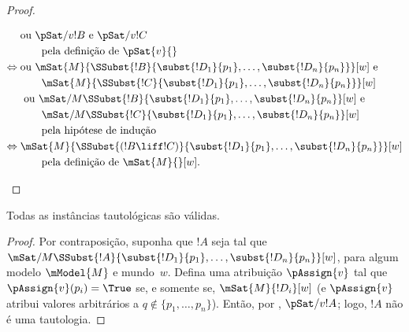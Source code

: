 \documentclass[../../../include/open-logic-section]{subfiles}
\begin{document}
\begin{proof}
\begin{enumerate}
{{\begin{align*}
        & \text{ou } \pSat/{v}{!B} \text{ e } \pSat/{v}{!C}\\
        &\qquad \text{pela definição de $\pSat{v}{}$}\\
        \Leftrightarrow {} &
        \text{ou } \mSat{M}{\SSubst{!B}{\subst{!D_1}{p_1}, \dots,
            \subst{!D_n}{p_n}}}[w] \text{ e }\\
        & \qquad \mSat{M}{\SSubst{!C}{\subst{!D_1}{p_1}, \dots,
          \subst{!D_n}{p_n}}}[w]\\ 
        &  \text{ ou } \mSat/{M}{\SSubst{!B}{\subst{!D_1}{p_1}, \dots,
            \subst{!D_n}{p_n}}}[w] \text{ e }\\
        & \qquad \mSat/{M}{\SSubst{!C}{\subst{!D_1}{p_1}, \dots,
          \subst{!D_n}{p_n}}}[w]\\
        &\qquad\text{pela hipótese de indução}\\
        \Leftrightarrow {} &
        \mSat{M}{\SSubst{(!B \liff !C)}{\subst{!D_1}{p_1}, \dots,
          \subst{!D_n}{p_n}}}[w]\\
        &\qquad \text{pela definição de $\mSat{M}{}[w]$}.
      \end{align*}}}{}
  \end{enumerate}
  \end{proof}

\begin{prop}
  Todas as instâncias tautológicas são válidas.
\end{prop}

\begin{proof}
  Por contraposição, suponha que $!A$ seja tal que
  $\mSat/{M}{\SSubst{!A}{\subst{!D_1}{p_1}, \dots,
  \subst{!D_n}{p_n}}}[w]$, para algum modelo $\mModel{M}$ e mundo~$w$.
  Defina uma atribuição $\pAssign{v}$ tal que $\pAssign{v}(p_i) = \True$
  se, e somente se, $\mSat{M}{!D_i}[w]$ (e $\pAssign{v}$ atribui valores
  arbitrários a $q \notin \{p_1, \dots, p_n \}$). Então, por
  , $\pSat/{v}{!A}$; logo, $!A$ não é uma tautologia.
\end{proof}
\end{document}
